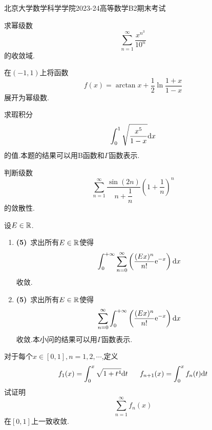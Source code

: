 \documentclass{ctexart}
\begin{document}
\pagestyle{empty}
\begin{center}\Large
    北京大学数学科学学院2023-24高等数学B2期末考试
\end{center}
\begin{problem}[1.(10\songti{分})]
    求幂级数
    \[\sum_{n=1}^{\infty}\dfrac{x^{n^3}}{10^n}\]
    的收敛域.

\end{problem}

\begin{problem}[2.(10\songti{分})]
    在$(-1,1)$上将函数
    \[f(x)=\arctan x+\dfrac12\ln\dfrac{1+x}{1-x}\]
    展开为幂级数.

\end{problem}

\begin{problem}[3.(10\songti{分})]
    求瑕积分
    \[\int_0^1\sqrt{\dfrac{x^5}{1-x}}\mathrm{d} x\]
    的值.本题的结果可以用B函数和$\Gamma$函数表示.

\end{problem}

\begin{problem}[4.(10\songti{分})]
    判断级数
    \[\sum_{n=1}^{\infty}\dfrac{\sin(2n)}{n+\dfrac1n}\left(1+\dfrac1n\right)^n\]
    的敛散性.
        
\end{problem}

\begin{problem}[5.(10\songti{分})]
    设$E\in\mathbb{R}$.
    \begin{enumerate}[label=\tbf{(\arabic*)},topsep=0pt,parsep=0pt,itemsep=0pt,partopsep=0pt]
        \item \textbf{(5)}\ 求出所有$E\in\mathbb{R}$使得
            \[\int_0^{+\infty}\sum_{n=0}^{\infty}\left(\dfrac{(Ex)^n}{n!}\mathrm{e}^{-x}\right)\mathrm{d} x\]
            收敛.
        \item \textbf{(5)}\ 求出所有$E\in\mathbb{R}$使得
            \[\sum_{n=0}^{\infty}\int_0^{+\infty}\left(\dfrac{(Ex)^n}{n!}\mathrm{e}^{-x}\right)\mathrm{d} x\]
            收敛.本小问的结果可以用$\Gamma$函数表示.
    \end{enumerate}
\end{problem}

\begin{problem}[6.(10\songti{分})]
    对于每个$x\in[0,1],n=1,2,\cdots$,定义
    \[f_1(x)=\int_0^x\sqrt{1+t^4}\di t\ \ \ \ \ f_{n+1}(x)=\int_0^xf_n(t)\di t\]
    试证明
    \[\sum_{n=1}^{\infty}f_n(x)\]
    在$[0,1]$上一致收敛.
\end{problem}
\end{document}
